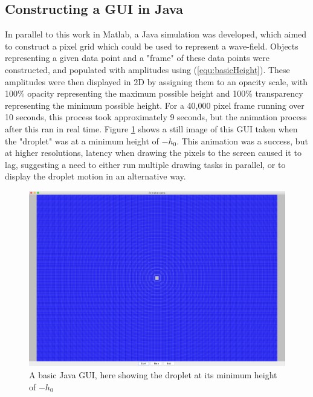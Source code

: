 \subsection{Constructing a GUI in Java}
In parallel to this work in Matlab, a Java simulation was developed, which aimed to construct a pixel grid which could be used to represent a wave-field. Objects representing a given data point and a "frame" of these data points were constructed, and populated with amplitudes using (\ref{equ:basicHeight}). These amplitudes were then displayed in 2D by assigning them to an opacity scale, with 100\% opacity representing the maximum possible height and 100\% transparency representing the minimum possible height. For a 40,000 pixel frame running over 10 seconds, this process took approximately 9 seconds, but the animation process after this ran in real time. Figure \ref{fig:javaBasicHeight} shows a still image of this GUI taken when the "droplet" was at a minimum height of $-h_0$. This animation was a success, but at higher resolutions, latency when drawing the pixels to the screen caused it to lag, suggesting a need to either run multiple drawing tasks in parallel, or to display the droplet motion in an alternative way.

\begin{figure}
    \centering
    \includegraphics[width=\textwidth]{simulation/javaMaxHeight.png}
    \caption{A basic Java GUI, here showing the droplet at its minimum height of $-h_0$}
    \label{fig:javaBasicHeight}
\end{figure}

